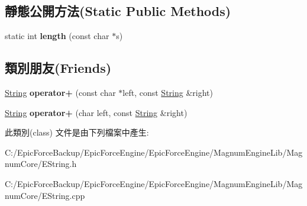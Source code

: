 \subsection*{靜態公開方法(Static Public Methods)}
\begin{DoxyCompactItemize}
\item 
static int {\bfseries length} (const char $\ast$s)\hypertarget{class_magnum_1_1_string_a2b61a3d36b40be3414c0028ffb52bc0b}{}\label{class_magnum_1_1_string_a2b61a3d36b40be3414c0028ffb52bc0b}

\end{DoxyCompactItemize}
\subsection*{類別朋友(Friends)}
\begin{DoxyCompactItemize}
\item 
\hyperlink{class_magnum_1_1_string}{String} {\bfseries operator+} (const char $\ast$left, const \hyperlink{class_magnum_1_1_string}{String} \&right)\hypertarget{class_magnum_1_1_string_a1781d316e3efc3a1f7501d377498c74b}{}\label{class_magnum_1_1_string_a1781d316e3efc3a1f7501d377498c74b}

\item 
\hyperlink{class_magnum_1_1_string}{String} {\bfseries operator+} (char left, const \hyperlink{class_magnum_1_1_string}{String} \&right)\hypertarget{class_magnum_1_1_string_a024271b21b78cd1e9f7b8005955567f2}{}\label{class_magnum_1_1_string_a024271b21b78cd1e9f7b8005955567f2}

\end{DoxyCompactItemize}


此類別(class) 文件是由下列檔案中產生\+:\begin{DoxyCompactItemize}
\item 
C\+:/\+Epic\+Force\+Backup/\+Epic\+Force\+Engine/\+Epic\+Force\+Engine/\+Magnum\+Engine\+Lib/\+Magnum\+Core/E\+String.\+h\item 
C\+:/\+Epic\+Force\+Backup/\+Epic\+Force\+Engine/\+Epic\+Force\+Engine/\+Magnum\+Engine\+Lib/\+Magnum\+Core/E\+String.\+cpp\end{DoxyCompactItemize}
